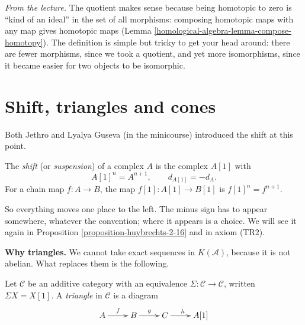 \medskip\noindent
{\it From the lecture.} The quotient makes sense
because being homotopic to zero is
``kind of an ideal'' in the set of all
morphisms: composing homotopic maps with
any map gives homotopic maps (Lemma
\ref{homological-algebra-lemma-compose-homotopy}).
The definition is simple but tricky to
get your head around: there are fewer
morphisms, since we took a quotient, and
yet more isomorphisms, since it became
easier for two objects to be isomorphic.

\section{Shift, triangles and cones}
\label{section-shift-triangles-cones}

\noindent
Both Jethro and Lyalya Guseva (in the
minicourse) introduced the shift at this
point.

\begin{definition}
\label{definition-shift}
The {\it shift} (or {\it suspension})
of a complex $A$ is the complex $A[1]$
with
$$
A[1]^n=A^{n+1},
\qquad
d_{A[1]}=-d_A.
$$
For a chain map $f:A\to B$, the map
$f[1]:A[1]\to B[1]$ is
$f[1]^n=f^{n+1}$.
\end{definition}

\noindent
So everything moves one place to the
left. The minus sign has to appear
somewhere, whatever the convention; where
it appears is a choice. We will see it
again in Proposition
\ref{proposition-huybrechts-2-16} and in
axiom (TR2).

\medskip\noindent
{\bf Why triangles.} We cannot take
exact sequences in $K(\mathcal{A})$,
because it is not abelian. What replaces
them is the following.

\begin{definition}
\label{definition-triangle}
Let $\mathcal{C}$ be an additive category
with an equivalence
$\Sigma:\mathcal{C}\to\mathcal{C}$,
written $\Sigma X=X[1]$.
A {\it triangle} in $\mathcal{C}$ is a
diagram
$$
\xymatrix{
A\ar[r]^{f}
&B\ar[r]^{g}
&C\ar[r]^{h}
&A[1]
}
$$
\end{definition}

